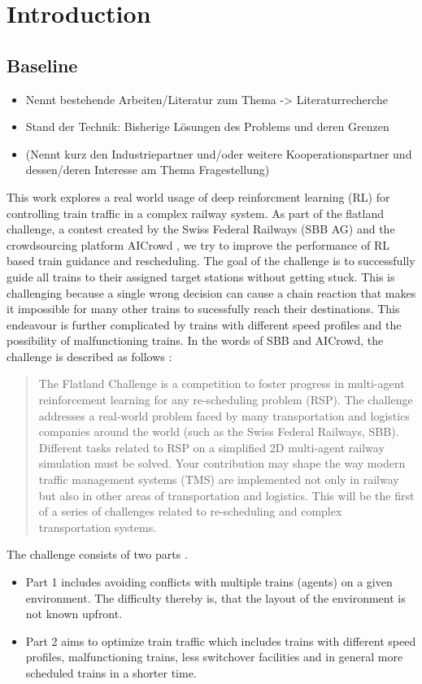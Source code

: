 \chapter{Introduction}\label{chap.einleitung}
\section{Baseline}\label{baseline}
\begin{itemize}
\item Nennt bestehende Arbeiten/Literatur zum Thema -> Literaturrecherche
\item Stand der Technik: Bisherige Lösungen des Problems und deren Grenzen
\item (Nennt kurz den Industriepartner und/oder weitere Kooperationspartner und dessen/deren Interesse am Thema Fragestellung)
\end{itemize}
This work explores a real world usage of deep reinforcment learning (RL) for controlling train traffic in a complex railway system.
As part of the flatland challenge, a contest created by the Swiss Federal Railways (SBB AG) and the crowdsourcing platform AICrowd \cite{aicrowd}, we try to improve the performance of RL based train guidance and rescheduling. The goal of the challenge is to successfully guide all trains to their assigned target stations without getting stuck. This is challenging because a single wrong decision can cause a chain reaction that makes it impossible for many other trains to sucessfully reach their destinations. This endeavour is further complicated by trains with different speed profiles and the possibility of malfunctioning trains. In the words of SBB and AICrowd, the challenge is described as follows \cite{aicrowd}:
\begin{quote}
	The Flatland Challenge is a competition to foster progress in multi-agent reinforcement learning for any re-scheduling problem (RSP). The challenge addresses a real-world problem faced by many transportation and logistics companies around the world (such as the Swiss Federal Railways, SBB). Different tasks related to RSP on a simplified 2D multi-agent railway simulation must be solved. Your contribution may shape the way modern traffic management systems (TMS) are implemented not only in railway but also in other areas of transportation and logistics. This will be the first of a series of challenges related to re-scheduling and complex transportation systems.
\end{quote}
The challenge consists of two parts \cite{aicrowd}.  
\begin{itemize}
	\item Part 1 includes avoiding conflicts with multiple trains (agents) on a given environment. The difficulty thereby is, that the layout of the environment is not known upfront.
	\item Part 2 aims to optimize train traffic which includes trains with different speed profiles, malfunctioning trains, less switchover facilities and in general more scheduled trains in a shorter time.
\end{itemize}
